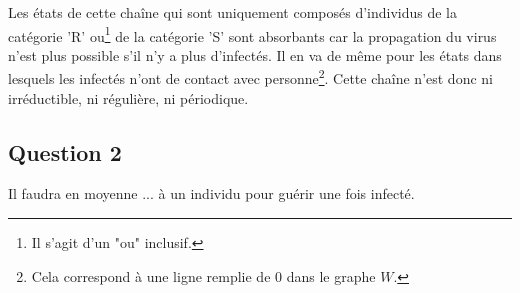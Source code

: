 \documentclass[a4paper, 12pt, oneside]{article}
\begin{document}
	Les états de cette chaîne qui sont uniquement composés d'individus de la catégorie 'R' ou\footnote{Il s'agit d'un "ou" inclusif.} de la catégorie 'S' sont absorbants car la propagation du virus n'est plus possible s'il n'y a plus d'infectés. Il en va de même pour les états dans lesquels les infectés n'ont de contact avec personne\footnote{Cela correspond à une ligne remplie de 0 dans le graphe $W$.}. Cette chaîne n'est donc ni irréductible, ni régulière, ni périodique.

\subsection{Question 2}

Il faudra en moyenne ... à un individu pour guérir une fois infecté.
	
\end{document}
